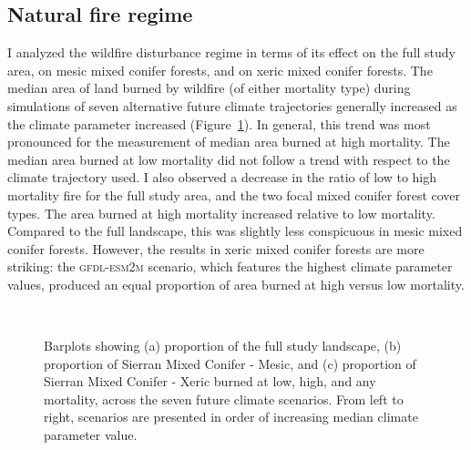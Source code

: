 \subsection*{Natural fire regime}

I analyzed the wildfire disturbance regime in terms of its effect on the full study area, on mesic mixed conifer forests, and on xeric mixed conifer forests. 
%
The median area of land burned by wildfire (of either mortality type) during simulations of seven alternative future climate trajectories generally increased as the climate parameter increased (Figure~\ref{fig:dareacomp}). In general, this trend was most pronounced for the measurement of median area burned at high mortality. The median area burned at low mortality did not follow a trend with respect to the climate trajectory used. I also observed a decrease in the ratio of low to high mortality fire for the full study area, and the two focal mixed conifer forest cover types. The area burned at high mortality increased relative to low mortality. Compared to the full landscape, this was slightly less conspicuous in mesic mixed conifer forests. However, the results in xeric mixed conifer forests are more striking: the \textsc{gfdl-esm2m} scenario, which features the highest climate parameter values, produced an equal proportion of area burned at high versus low mortality.



\begin{figure}[!htbp]
  \centering
     \\
    \caption{Barplots showing (a) proportion of the full study landscape, (b) proportion of Sierran Mixed Conifer - Mesic, and (c) proportion of Sierran Mixed Conifer - Xeric burned at low, high, and any mortality, across the seven future climate scenarios. From left to right, scenarios are presented in order of increasing median climate parameter value.}
  \label{fig:dareacomp}
\end{figure}


